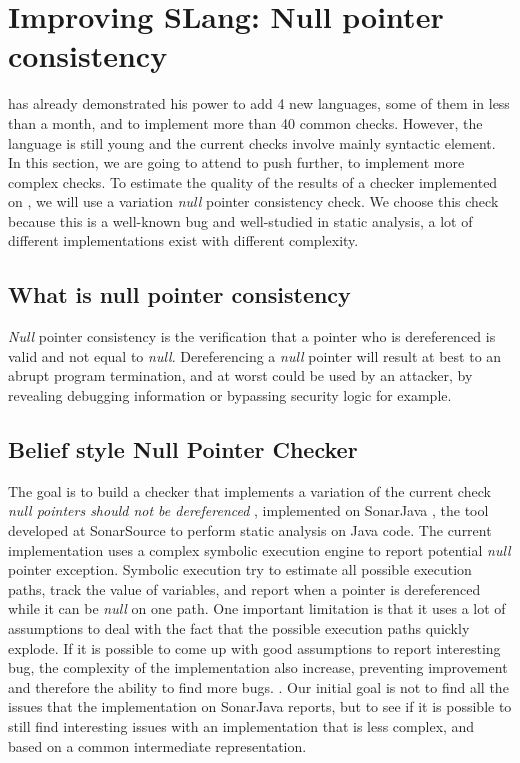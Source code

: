 \section{Improving SLang: Null pointer consistency}
\label{sec:improving_slang}

\slang{} has already demonstrated his power to add 4 new languages, some of them in less than a month, and to implement more than 40 common checks. 
However, the language is still young and the current checks involve mainly syntactic element. 
In this section, we are going to attend to push \slang{} further, to implement more complex checks.
To estimate the quality of the results of a checker implemented on \slang{}, we will use a variation \emph{null} pointer consistency check. 
We choose this check because this is a well-known bug and well-studied in static analysis, a lot of different implementations exist with different complexity.

\subsection{What is null pointer consistency}
\label{subsec:null_pointer_consistency}

\emph{Null} pointer consistency is the verification that a pointer who is dereferenced is valid and not equal to \emph{null}. Dereferencing a \emph{null} pointer will result at best to an abrupt program termination, and at worst could be used by an attacker, by revealing debugging information or bypassing security logic for example.

\subsection{Belief style Null Pointer Checker}
\label{subsec:belief_style}

The goal is to build a checker that implements a variation of the current check \emph{null pointers should not be dereferenced} \cite{RSPEC-2259:2019:Online}, implemented on SonarJava \cite{SonarJava:2019:Online}, the tool developed at SonarSource to perform static analysis on Java code.
The current implementation uses a complex symbolic execution engine to report potential \emph{null} pointer exception.
Symbolic execution try to estimate all possible execution paths, track the value of variables, and report when a pointer is dereferenced while it can be \emph{null} on one path.
One important limitation is that it uses a lot of assumptions to deal with the fact that the possible execution paths quickly explode. 
If it is possible to come up with good assumptions to report interesting bug, the complexity of the implementation also increase, preventing improvement and therefore the ability to find more bugs. \cite{Brown:2016:BSC:2954679.2872364}. 
Our initial goal is not to find all the issues that the implementation on SonarJava reports, but to see if it is possible to still find interesting issues with an implementation that is less complex, and based on a common intermediate representation.

